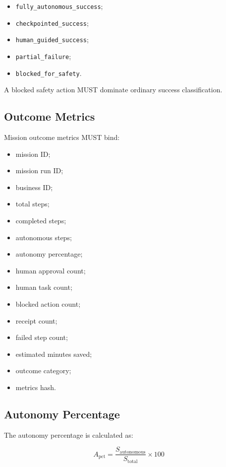 \begin{itemize}
  \item \texttt{fully\_autonomous\_success};
  \item \texttt{checkpointed\_success};
  \item \texttt{human\_guided\_success};
  \item \texttt{partial\_failure};
  \item \texttt{blocked\_for\_safety}.
\end{itemize}

A blocked safety action MUST dominate ordinary success classification.

\subsection{Outcome Metrics}

Mission outcome metrics MUST bind:

\begin{itemize}
  \item mission ID;
  \item mission run ID;
  \item business ID;
  \item total steps;
  \item completed steps;
  \item autonomous steps;
  \item autonomy percentage;
  \item human approval count;
  \item human task count;
  \item blocked action count;
  \item receipt count;
  \item failed step count;
  \item estimated minutes saved;
  \item outcome category;
  \item metrics hash.
\end{itemize}

\subsection{Autonomy Percentage}

The autonomy percentage is calculated as:

\begin{equation}
A_{\mathrm{pct}}
=
\frac{S_{\mathrm{autonomous}}}{S_{\mathrm{total}}}
\times
100
\end{equation}


